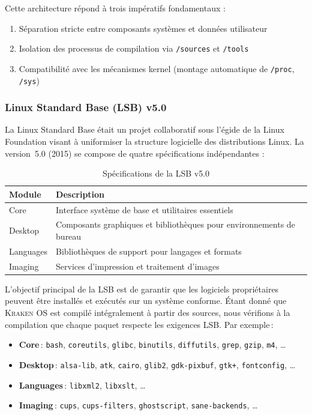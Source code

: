 Cette architecture répond à trois impératifs fondamentaux :
\begin{enumerate}
    \item Séparation stricte entre composants systèmes et données utilisateur
    \item Isolation des processus de compilation via \texttt{/sources} et \texttt{/tools}
    \item Compatibilité avec les mécanismes kernel (montage automatique de \texttt{/proc}, \texttt{/sys})
\end{enumerate}




\subsubsection{Linux Standard Base (LSB) v5.0}
\label{sssec:lsb}
La Linux Standard Base était un projet collaboratif sous l’égide de la Linux Foundation visant à uniformiser la structure logicielle des distributions Linux. La version 5.0 (2015) se compose de quatre spécifications indépendantes :

\begin{table}[htbp]
  \centering
  \caption{Spécifications de la LSB v5.0}
  \label{tab:lsb-specs}
  \begin{tabular}{|l| p{8cm}|}
    \toprule
    \textbf{Module} & \textbf{Description} \\
    \midrule
    Core     & Interface système de base et utilitaires essentiels \\ \hline
    Desktop  & Composants graphiques et bibliothèques pour environnements de bureau  \\ 
    Languages& Bibliothèques de support pour langages et formats  \\  \hline
    Imaging  & Services d’impression et traitement d’images  \\
    \bottomrule
  \end{tabular}
\end{table}

L’objectif principal de la LSB est de garantir que les logiciels propriétaires peuvent être installés et exécutés sur un système conforme.  
Étant donné que \textsc{Kraken OS} est compilé intégralement à partir des sources, nous vérifions à la compilation que chaque paquet respecte les exigences LSB. Par exemple :

\begin{itemize}
  \item \textbf{Core} : \texttt{bash}, \texttt{coreutils}, \texttt{glibc}, \texttt{binutils}, \texttt{diffutils}, \texttt{grep}, \texttt{gzip}, \texttt{m4}, \dots  
  \item \textbf{Desktop} : \texttt{alsa-lib}, \texttt{atk}, \texttt{cairo}, \texttt{glib2}, \texttt{gdk-pixbuf}, \texttt{gtk+}, \texttt{fontconfig}, \dots  
  \item \textbf{Languages} : \texttt{libxml2}, \texttt{libxslt}, \dots  
  \item \textbf{Imaging} : \texttt{cups}, \texttt{cups-filters}, \texttt{ghostscript}, \texttt{sane-backends}, \dots  
\end{itemize}

